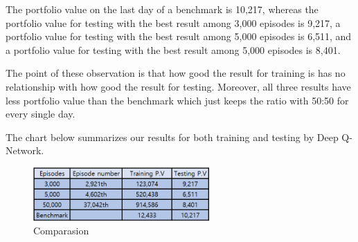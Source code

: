 The portfolio value on the last day of a benchmark is 10,217, whereas the portfolio value for testing with the best result among 3,000 episodes is 9,217, a portfolio value for testing with the best result among 5,000 episodes is 6,511, and a portfolio value for testing with the best result among 5,000 episodes is 8,401. 

The point of these observation is that how good the result for training is has no relationship with how good the result for testing. Moreover, all three results have less portfolio value than the benchmark which just keeps the ratio with 50:50 for every single day. 

The chart below summarizes our results for both training and testing by Deep Q-Network. 

\begin{figure}[H]
\begin{center}
\includegraphics[clip, width=0.6\textwidth]{Graphics/image2.png} \caption{Comparasion}
\end{center}
\end{figure}

